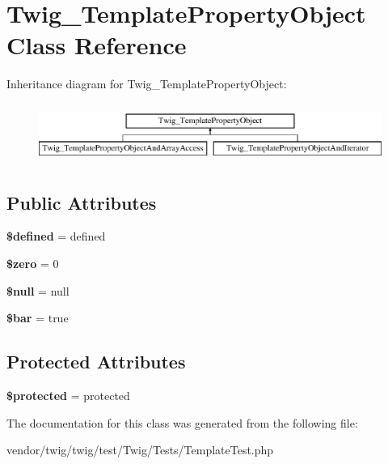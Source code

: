 \hypertarget{classTwig__TemplatePropertyObject}{}\section{Twig\+\_\+\+Template\+Property\+Object Class Reference}
\label{classTwig__TemplatePropertyObject}
Inheritance diagram for Twig\+\_\+\+Template\+Property\+Object\+:\begin{figure}[H]
\begin{center}
\leavevmode
\includegraphics[height=1.951219cm]{classTwig__TemplatePropertyObject}
\end{center}
\end{figure}
\subsection*{Public Attributes}
\begin{DoxyCompactItemize}
\item 
{\bfseries \$defined} = \textquotesingle{}defined\textquotesingle{}\hypertarget{classTwig__TemplatePropertyObject_a6ea2597227d7ac5d4b71076db2ff4660}{}\label{classTwig__TemplatePropertyObject_a6ea2597227d7ac5d4b71076db2ff4660}

\item 
{\bfseries \$zero} = 0\hypertarget{classTwig__TemplatePropertyObject_a92e505533182ce52b1dba6c6d7d713da}{}\label{classTwig__TemplatePropertyObject_a92e505533182ce52b1dba6c6d7d713da}

\item 
{\bfseries \$null} = null\hypertarget{classTwig__TemplatePropertyObject_ad04dd8b51415e31864ad407e9463ce5e}{}\label{classTwig__TemplatePropertyObject_ad04dd8b51415e31864ad407e9463ce5e}

\item 
{\bfseries \$bar} = true\hypertarget{classTwig__TemplatePropertyObject_a4c0ba7b75a57983acc5534a516ef86a8}{}\label{classTwig__TemplatePropertyObject_a4c0ba7b75a57983acc5534a516ef86a8}

\end{DoxyCompactItemize}
\subsection*{Protected Attributes}
\begin{DoxyCompactItemize}
\item 
{\bfseries \$protected} = \textquotesingle{}protected\textquotesingle{}\hypertarget{classTwig__TemplatePropertyObject_ac649e71e2b0b6955bcb0852e9e7c9716}{}\label{classTwig__TemplatePropertyObject_ac649e71e2b0b6955bcb0852e9e7c9716}

\end{DoxyCompactItemize}


The documentation for this class was generated from the following file\+:\begin{DoxyCompactItemize}
\item 
vendor/twig/twig/test/\+Twig/\+Tests/Template\+Test.\+php\end{DoxyCompactItemize}
